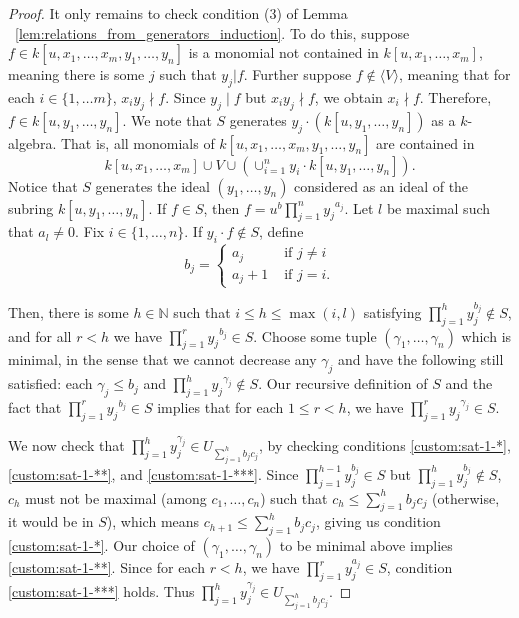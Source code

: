 \documentclass{amsart}
\theoremstyle{plain}
\theoremstyle{definition}
\theoremstyle{remark}
\numberwithin{equation}{section}
\newcommand\BN{{\mathbb N}}
\begin{document}
\begin{proof}
It only remains to check condition (3) of Lemma ~\ref{lem:relations_from_generators_induction}. To do this, suppose $f\in k[u, x_1, \ldots, x_m, y_1, \ldots, y_n]$ is a monomial not contained in $k[u, x_1, \ldots, x_m]$, meaning there is some $j$ such that $y_j|f$.  Further suppose $f\not\in \langle V \rangle$, meaning that for each $i\in \{1, \ldots m\}$, $x_iy_j \nmid f$. Since $y_j \mid f$ but $x_iy_j \nmid f$, we obtain $x_i\nmid f$.  Therefore, $f\in k[u, y_1, \ldots, y_n]$.  We note that $S$ generates $y_j \cdot (k[u,y_1, \ldots, y_n])$ as a $k$-algebra.  That is, all monomials of $k[u, x_1, \ldots, x_m, y_1, \ldots, y_n]$ are contained in
\[
	k[u, x_1, \ldots, x_m] \cup V \cup \left(\cup_{i=1}^n y_i \cdot k[u, y_1, \ldots, y_n]\right). 
\]
Notice that $S$ generates the ideal $(y_1, \ldots, y_n)$ considered as an ideal of the subring $k[u, y_1, \ldots, y_n]$.  If $f\in S$, then $f=u^b \prod_{j=1}^n {y_j}^{a_j}$. Let $l$ be maximal such that $a_l\ne 0$.
Fix $i \in \{1, \ldots, n\}$. If $y_i \cdot f \notin S$, define
$$
b_j = \begin{cases}
	a_j &\text{ if } j \neq i\\
	a_j + 1 &\text{ if } j=i.
\end{cases}$$

\noindent
Then, there is some $h \in \BN$ such that $i \le h \le \max(i, l)$ satisfying $\prod_{j = 1}^h y_j^{b_j}\not\in S$, 
and for all $r<h$ we have $\prod_{j=1}^r {y_j}^{b_j}\in S$.  
Choose some tuple $(\gamma_1, \ldots, \gamma_n)$ which is minimal, in the sense that we cannot decrease any $\gamma_j$ 
and have the following still satisfied: each $\gamma_j\le b_j$ 
and $\prod_{j=1}^h {y_j}^{\gamma_j}\not\in S.$ Our recursive definition of 
$S$ and the fact that $\prod_{j=1}^r {y_j}^{b_j}\in S$ implies that for each $1\le r< h$, we have $\prod_{j=1}^r {y_j}^{\gamma_j}\in S$.

We now check that $\prod_{j=1}^h y_j^{\gamma_j}\in U_{\sum_{j=1}^h b_j c_j}$, by checking conditions \ref{custom:sat-1-*}, \ref{custom:sat-1-**}, and \ref{custom:sat-1-***}.  Since $\prod_{j=1}^{h-1} y_j^{b_j}\in S$ but $\prod_{j=1}^h y_j^{b_j}\not\in S$, $c_h$ must not be maximal (among $c_1, \ldots, c_n$) such that $c_h \le \sum_{j=1}^h b_jc_j$ (otherwise, it would be in $S$), which means $c_{h+1}\le \sum_{j=1}^h b_jc_j$, giving us condition \ref{custom:sat-1-*}.  Our choice of $(\gamma_1, \ldots, \gamma_n)$ to be minimal above implies \ref{custom:sat-1-**}.  Since for each $r<h$, we have $\prod_{j=1}^r y_{j}^{a_j}\in S$, condition \ref{custom:sat-1-***} holds.  Thus $\prod_{j=1}^h y_j^{\gamma_j}\in U_{\sum_{j=1}^h b_j c_j}$.


\end{proof}
\end{document}
